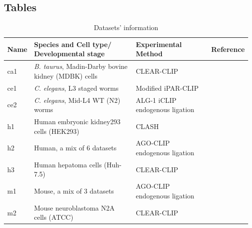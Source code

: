 \documentclass{bmcart}
\begin{document}
\begin{backmatter}

\clearpage
\section*{Tables}
\begin{table}[h!]
\caption{Datasets' information}
\label{tbl:dataset_description}
\begin{tabular}{|l|p{5cm}|p{4cm}|l|}
	\hline
	\textbf{Name} & \textbf{Species and Cell type/ Developmental stage} & \textbf{Experimental Method} & \textbf{Reference} \\
	\hline
	
    ca1 &
	\textit{B. taurus}, Madin-Darby bovine kidney (MDBK) cells &
	CLEAR-CLIP                        
	& \cite{scheel2017global} \\
	\hline
	
    ce1 &
	\textit{C. elegans}, L3 staged worms & 
	Modified iPAR-CLIP & 
	\cite{grosswendt2014unambiguous}  \\
	\hline

    ce2 &
	\textit{C. elegans}, Mid-L4 WT (N2) worms & 
	ALG-1 iCLIP endogenous ligation & 
	\cite{broughton2016pairing} \\
	\hline

    h1 &
	Human embryonic kidney293 cells (HEK293) & 
	CLASH  & 
	\cite{helwak2013mapping} \\
	\hline
	
    h2 &
	Human, a mix of 6 datasets & 
	AGO-CLIP endogenous ligation &  
	\cite{grosswendt2014unambiguous} \\
	\hline
	
    h3 &
	Human hepatoma cells (Huh-7.5) & 
	CLEAR-CLIP & 
	\cite{darnell_moore2015mirna} \\
	\hline
	
    m1 &
	Mouse, a mix of 3 datasets & 
	AGO-CLIP endogenous ligation & 
	\cite{grosswendt2014unambiguous} \\
	\hline
	
    m2 &
	Mouse neuroblastoma N2A cells (ATCC)  & 
	CLEAR-CLIP & 
	\cite{darnell_moore2015mirna} \\
	\hline
\end{tabular}
\end{table}


\end{backmatter}
\end{document}
